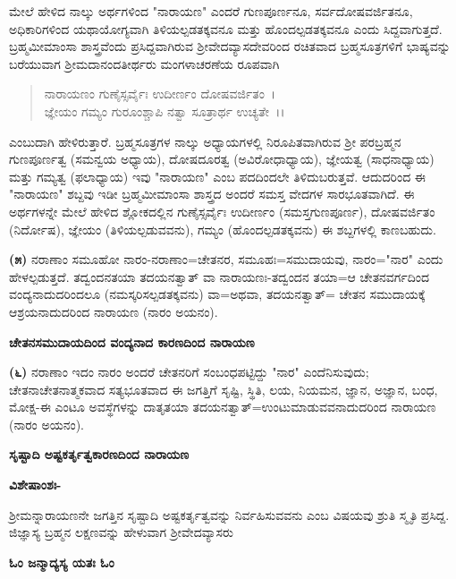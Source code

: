 ಮೇಲೆ ಹೇಳಿದ ನಾಲ್ಕು ಅರ್ಥಗಳಿಂದ "ನಾರಾಯಣ" ಎಂದರೆ ಗುಣಪೂರ್ಣನೂ, ಸರ್ವದೋಷವರ್ಜಿತನೂ, ಅಧಿಕಾರಿಗಳಿಂದ ಯಥಾಯೋಗ್ಯವಾಗಿ ತಿಳಿಯಲ್ಪಡತಕ್ಕವನೂ ಮತ್ತು ಹೊಂದಲ್ಪಡತಕ್ಕವನೂ ಎಂದು ಸಿದ್ದವಾಗುತ್ತದೆ. ಬ್ರಹ್ಮಮೀಮಾಂಸಾ ಶಾಸ್ತ್ರವೆಂದು ಪ್ರಸಿದ್ದವಾಗಿರುವ ಶ‍್ರೀವೇದವ್ಯಾಸದೇವರಿಂದ ರಚಿತವಾದ ಬ್ರಹ್ಮಸೂತ್ರಗಳಿಗೆ ಭಾಷ್ಯವನ್ನು ಬರೆಯುವಾಗ ಶ‍್ರೀಮದಾನಂದತೀರ್ಥರು ಮಂಗಳಾಚರಣೆಯ ರೂಪವಾಗಿ

\begin{verse}
ನಾರಾಯಣಂ ಗುಣೈಸ್ಸರ್ವೈಃ ಉದೀರ್ಣಂ ದೋಷವರ್ಜಿತಂ~।\\ ಜ್ಞೇಯಂ ಗಮ್ಯಂ ಗುರೂಂಶ್ಚಾಪಿ ನತ್ವಾ ಸೂತ್ರಾರ್ಥ ಉಚ್ಯತೇ~।।
\end{verse}

\noindent
ಎಂಬುದಾಗಿ ಹೇಳಿರುತ್ತಾರೆ. ಬ್ರಹ್ಮಸೂತ್ರಗಳ ನಾಲ್ಕು ಅಧ್ಯಾಯಗಳಲ್ಲಿ ನಿರೂಪಿತವಾಗಿರುವ ಶ‍್ರೀ ಪರಬ್ರಹ್ಮನ ಗುಣಪೂರ್ಣತ್ವ (ಸಮನ್ವಯ ಅಧ್ಯಾಯ), ದೋಷದೂರತ್ವ (ಅವಿರೋಧಾಧ್ಯಾಯ), ಜ್ಞೇಯತ್ವ (ಸಾಧನಾಧ್ಯಾಯ) ಮತ್ತು ಗಮ್ಯತ್ವ (ಫಲಾಧ್ಯಾಯ) ಇವು "ನಾರಾಯಣ" ಎಂಬ ಪದದಿಂದಲೇ ತಿಳಿದುಬರುತ್ತವೆ. ಆದುದರಿಂದ ಈ "ನಾರಾಯಣ" ಶಬ್ದವು ಇಡೀ ಬ್ರಹ್ಮಮೀಮಾಂಸಾ ಶಾಸ್ತ್ರದ ಅಂದರೆ ಸಮಸ್ತ ವೇದಗಳ ಸಾರಭೂತವಾಗಿದೆ. ಈ ಅರ್ಥಗಳನ್ನೇ ಮೇಲೆ ಹೇಳಿದ ಶ್ಲೋಕದಲ್ಲಿನ ಗುಣೈಸ್ಸರ್ವೈಃ ಉದೀರ್ಣಂ (ಸಮಸ್ತಗುಣಪೂರ್ಣ), ದೋಷವರ್ಜಿತಂ (ನಿರ್ದೋಷ), ಜ್ಞೇಯಂ (ತಿಳಿಯಲ್ಪಡುವವನು), ಗಮ್ಯಂ (ಹೊಂದಲ್ಪಡತಕ್ಕವನು) ಈ ಶಬ್ದಗಳಲ್ಲಿ ಕಾಣಬಹುದು.

\textbf{(೫)} ನರಾಣಾಂ ಸಮೂಹೋ ನಾರಂ-ನರಾಣಾಂ=ಚೇತನರ, ಸಮೂಹಃ=ಸಮುದಾಯವು, ನಾರಂ="ನಾರ" ಎಂದು ಹೇಳಲ್ಪಡುತ್ತದೆ. ತದ್ವಂದನತಯಾ ತದಯನತ್ವಾತ್ ವಾ ನಾರಾಯಣಃ-ತದ್ವಂದನ ತಯಾ=ಆ ಚೇತನವರ್ಗದಿಂದ ವಂದ್ಯನಾದುದರಿಂದಲೂ (ನಮಸ್ಕರಿಸಲ್ಪಡತಕ್ಕವನು) ವಾ=ಅಥವಾ, ತದಯನತ್ವಾತ್= ಚೇತನ ಸಮುದಾಯಕ್ಕೆ ಆಶ್ರಯನಾದುದರಿಂದ ನಾರಾಯಣ (ನಾರಂ ಅಯನಂ).

\begin{center}
\textbf{ಚೇತನಸಮುದಾಯದಿಂದ ವಂದ್ಯನಾದ ಕಾರಣದಿಂದ ನಾರಾಯಣ}
\end{center}

\textbf{(೬)} ನರಾಣಾಂ ಇದಂ ನಾರಂ ಅಂದರೆ ಚೇತನರಿಗೆ ಸಂಬಂಧಪಟ್ಟಿದ್ದು "ನಾರ" ಎಂದೆನಿಸುವುದು; ಚೇತನಾಚೇತನಾತ್ಮಕವಾದ ಸತ್ಯಭೂತವಾದ ಈ ಜಗತ್ತಿಗೆ ಸೃಷ್ಟಿ, ಸ್ಥಿತಿ, ಲಯ, ನಿಯಮನ, ಜ್ಞಾನ, ಅಜ್ಞಾನ, ಬಂಧ, ಮೋಕ್ಷ-ಈ ಎಂಟೂ ಅವಸ್ಥೆಗಳನ್ನು ದಾತೃತಯಾ ತದಯನತ್ವಾತ್=ಉಂಟುಮಾಡುವವನಾದುದರಿಂದ ನಾರಾಯಣ (ನಾರಂ ಅಯನಂ).

\begin{center}
\textbf{ಸೃಷ್ಟಾದಿ ಅಷ್ಟಕರ್ತೃತ್ವಕಾರಣದಿಂದ ನಾರಾಯಣ}
\end{center}

\noindent
\textbf{ವಿಶೇಷಾಂಶಃ-}

ಶ‍್ರೀಮನ್ನಾರಾಯಣನೇ ಜಗತ್ತಿನ ಸೃಷ್ಟಾದಿ ಅಷ್ಟಕರ್ತೃತ್ವವನ್ನು ನಿರ್ವಹಿಸುವವನು ಎಂಬ ವಿಷಯವು ಶ್ರುತಿ ಸ್ಮೃತಿ ಪ್ರಸಿದ್ದ. ಜಿಜ್ಞಾಸ್ಯ ಬ್ರಹ್ಮನ ಲಕ್ಷಣವನ್ನು ಹೇಳುವಾಗ ಶ‍್ರೀವೇದವ್ಯಾಸರು

\begin{center}
\textbf{ಓಂ ಜನ್ಮಾದ್ಯಸ್ಯ ಯತಃ ಓಂ}
\end{center}

